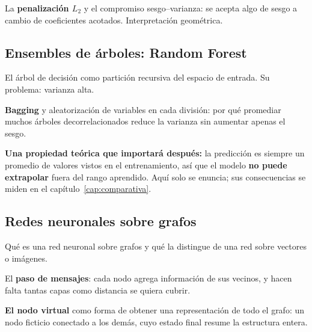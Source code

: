 La \textbf{penalización $L_2$} y el compromiso sesgo--varianza: se acepta algo de sesgo a
cambio de coeficientes acotados. Interpretación geométrica.

\subsection{Ensembles de árboles: Random Forest}
\label{sec:teoria_rf}
El árbol de decisión como partición recursiva del espacio de entrada. Su problema: varianza
alta.

\textbf{Bagging} y aleatorización de variables en cada división: por qué promediar muchos
árboles decorrelacionados reduce la varianza sin aumentar apenas el sesgo.

\textbf{Una propiedad teórica que importará después:} la predicción es siempre un promedio de
valores vistos en el entrenamiento, así que el modelo \textbf{no puede extrapolar} fuera del
rango aprendido. Aquí solo se enuncia; sus consecuencias se miden en el
capítulo~\ref{cap:comparativa}.

\subsection{Redes neuronales sobre grafos}
\label{sec:teoria_gnn}
%
%
Qué es una red neuronal sobre grafos y qué la distingue de una red sobre vectores o
imágenes.

El \textbf{paso de mensajes}: cada nodo agrega información de sus vecinos, y hacen falta
tantas capas como distancia se quiera cubrir.

\textbf{El nodo virtual} como forma de obtener una representación de todo el grafo: un nodo
ficticio conectado a los demás, cuyo estado final resume la estructura entera.

